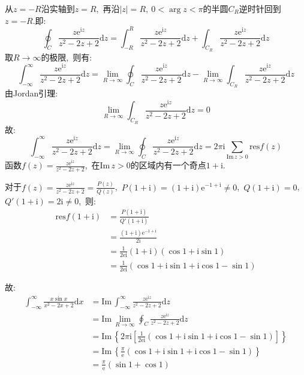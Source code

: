 \documentclass[a4paper,fontset=windows]{ctexart}
\begin{document}
\begin{itemize}
从$z=-R$沿实轴到$z=R$,\ 再沿$|z|=R,\ 0<\arg z<\pi$的半圆$C_R$逆时针回到$z=-R$.即:
\[
\oint_{C}\frac{z\mathrm{e}^{\mathrm{i}z}}{z^2-2z+2}\mathrm{d}z
=\int_{-R}^{R}\frac{z\mathrm{e}^{\mathrm{i}z}}{z^2-2z+2}\mathrm{d}z+\int_{C_R}\frac{z\mathrm{e}^{\mathrm{i}z}}{z^2-2z+2}\mathrm{d}z
\]
取$R\rightarrow\infty$的极限,\ 则有:
\[
\int_{-\infty}^{\infty}\frac{z\mathrm{e}^{\mathrm{i}z}}{z^2-2z+2}\mathrm{d}z
=\lim_{R \to \infty}\oint_{C}\frac{z\mathrm{e}^{\mathrm{i}z}}{z^2-2z+2}\mathrm{d}z-\lim_{R \to \infty}\int_{C_R}\frac{z\mathrm{e}^{\mathrm{i}z}}{z^2-2z+2}\mathrm{d}z
\]
由Jordan引理:
\[
\lim_{R \to \infty}\int_{C_R}\frac{z\mathrm{e}^{\mathrm{i}z}}{z^2-2z+2}\mathrm{d}z=0
\]
故:
\[
\int_{-\infty}^{\infty}\frac{z\mathrm{e}^{\mathrm{i}z}}{z^2-2z+2}\mathrm{d}z
=\lim_{R \to \infty}\oint_{C}\frac{z\mathrm{e}^{\mathrm{i}z}}{z^2-2z+2}\mathrm{d}z
=2\pi\mathrm{i}\sum_{\mathrm{Im}\,z>0}\mathrm{res}f(z)
\]
函数$f(z)=\frac{z\mathrm{e}^{\mathrm{i}z}}{z^2-2z+2}$,\ 在$\mathrm{Im}\,z>0$的区域内有一个奇点$1+\mathrm{i}$.

对于$f(z)=\frac{z\mathrm{e}^{\mathrm{i}z}}{z^2-2z+2}=\frac{P(z)}{Q(z)}$,\ $P(1+\mathrm{i})=(1+\mathrm{i})\mathrm{e}^{-1+\mathrm{i}}\neq0$,\ $Q(1+\mathrm{i})=0$,\ $Q'(1+\mathrm{i})=2\mathrm{i}\neq0$,\ 则:
\begin{align*}
\mathrm{res}f(1+\mathrm{i})
&=\frac{P(1+\mathrm{i})}{Q'(1+\mathrm{i})} \\
&=\frac{(1+\mathrm{i})\mathrm{e}^{-1+\mathrm{i}}}{2\mathrm{i}} \\
&=\frac{1}{2\mathrm{e}\mathrm{i}}(1+\mathrm{i})(\cos 1+\mathrm{i}\sin 1) \\
&=\frac{1}{2\mathrm{e}\mathrm{i}}(\cos 1+\mathrm{i}\sin 1+\mathrm{i}\cos 1-\sin 1)
\end{align*} 

故:
\begin{align*}
\int_{-\infty}^{\infty}\frac{x\sin x}{x^2-2x+2}\mathrm{d}x
&=\mathrm{Im}\,\int_{-\infty}^{\infty}\frac{z\mathrm{e}^{\mathrm{i}z}}{z^2-2z+2}\mathrm{d}z \\
&=\mathrm{Im}\,\lim_{R \to \infty}\oint_{C}\frac{z\mathrm{e}^{\mathrm{i}z}}{z^2-2z+2}\mathrm{d}z \\
&=\mathrm{Im}\, \left\lbrace 2\pi \mathrm{i}\left[\frac{1}{2\mathrm{e}\mathrm{i}}(\cos 1+\mathrm{i}\sin 1+\mathrm{i}\cos 1-\sin 1)\right]\right\rbrace \\
&=\mathrm{Im}\, \left\lbrace \frac{\pi}{\mathrm{e}}(\cos 1+\mathrm{i}\sin 1+\mathrm{i}\cos 1-\sin 1)\right\rbrace \\
&=\frac{\pi}{\mathrm{e}}(\sin 1+\cos 1)
\end{align*}


\end{itemize}
\end{document}
